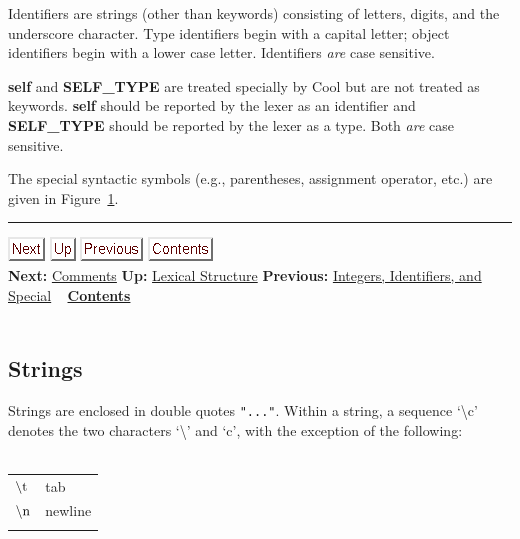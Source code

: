 \documentclass[]{article}
\begin{document}
Identifiers are strings (other than keywords) consisting of letters,
digits, and the underscore character. Type identifiers begin with a
capital letter; object identifiers begin with a lower case letter.
Identifiers \emph{are} case sensitive.

\textbf{self} and \textbf{SELF\_TYPE} are treated specially by Cool but
are not treated as keywords. \textbf{self} should be reported by the
lexer as an identifier and \textbf{SELF\_TYPE} should be reported by the
lexer as a type. Both \emph{are} case sensitive.

The special syntactic symbols (e.g., parentheses, assignment operator,
etc.) are given in Figure~\href{node39.html\#fig1}{1}.

\begin{center}\rule{3in}{0.4pt}\end{center}

\href{node36.html}{\includegraphics{next.png}}
\href{node33.html}{\includegraphics{up.png}}
\href{node34.html}{\includegraphics{prev.png}}
\href{node1.html}{\includegraphics{contents.png}} \\ \textbf{Next:}
\href{node36.html}{Comments} \textbf{Up:} \href{node33.html}{Lexical
Structure} \textbf{Previous:} \href{node34.html}{Integers, Identifiers,
and Special} ~ \textbf{\href{node1.html}{Contents}} \\ \\

\subsection{Strings}

Strings are enclosed in double quotes \texttt{"..."}. Within a string, a
sequence `\textbackslash{}c' denotes the two characters
`\textbackslash{}' and `c', with the exception of the following: \\ \\

\begin{longtable}[c]{@{}ll@{}}
\hline\noalign{\medskip}
$\rm\backslash t$ & tab
\\\noalign{\medskip}
$\rm\backslash n$ & newline
\\\noalign{\medskip}
\hline
\end{longtable}
\end{document}
